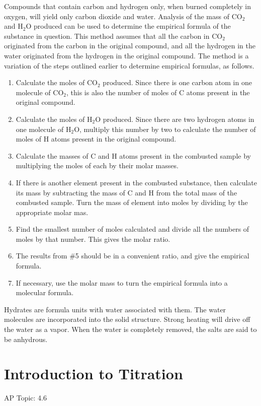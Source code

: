 \documentclass[../chem.tex]{subfiles}
\begin{document}
Compounds that contain carbon and hydrogen only, when burned completely in oxygen, will yield only carbon dioxide and water. Analysis of the mass of 
CO$_2$ and H$_2$O produced can be used to determine the empirical formula of the substance in question. This method assumes that all the carbon in 
CO$_2$ originated from the carbon in the original compound, and all the hydrogen in the water originated from the hydrogen in the original compound. The method is 
a variation of the steps outlined earlier to determine empirical formulas, as follows.
\begin{enumerate}
    \item Calculate the moles of CO$_2$ produced. Since there is one carbon atom in one molecule of CO$_2$, this is also the number of moles 
    of C atoms present in the original compound.
    \item Calculate the moles of H$_2$O produced. Since there are two hydrogen atoms in one molecule of H$_2$O, multiply this number by two to calculate the number of moles of H atoms present in the original compound.
    \item Calculate the masses of C and H atoms present in the combusted sample by multiplying the moles of each by their molar masses.
    \item If there is another element present in the combusted substance, then calculate its mass by subtracting the mass of C and H from the total mass of the combusted sample. Turn the mass of element into moles by dividing by the appropriate molar mas.
    \item Find the smallest number of moles calculated and divide all the numbers of moles by that number. This gives the molar ratio.
    \item The results from \#5 should be in a convenient ratio, and give the empirical formula.
    \item If necessary, use the molar mass to turn the empirical formula into a molecular formula.
\end{enumerate}

Hydrates are formula units with water associated with them. The water molecules are incorporated into the solid structure. Strong heating 
will drive off the water as a vapor. When the water is completely removed, the salts are said to be anhydrous.
\section{Introduction to Titration}
AP Topic: 4.6
\end{document}
